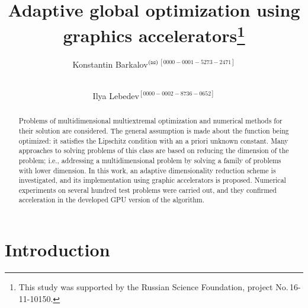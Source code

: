 \documentclass{svproc}
\def\orcidID#1{\unskip$^{[#1]}$}
\def\letter{$^{\textrm{(\Letter)}}$}
\begin{document}
\mainmatter              %
%
\title{Adaptive global optimization using graphics accelerators\thanks{This study was supported by the Russian Science Foundation, project No.\,16-11-10150.}
}
%
%
\author{Konstantin Barkalov\letter\orcidID{0000-0001-5273-2471} \and \\  Ilya Lebedev\orcidID{0000-0002-8736-0652}}
%
%
%
	

\begin{abstract}

Problems of multidimensional multiextremal optimization and numerical methods for their solution are considered. The general assumption is made about the function being optimized: it satisfies the Lipschitz condition with an a priori unknown constant. Many approaches to solving problems of this class are based on reducing the dimension of the problem; i.e., addressing a multidimensional problem by solving a family of problems with lower dimension. In this work, an adaptive dimensionality reduction scheme is investigated, and its implementation using graphic accelerators is proposed. Numerical experiments on several hundred test problems were carried out, and they confirmed acceleration in the developed GPU version of the algorithm.


\end{abstract}

\section{Introduction}
\end{document}
